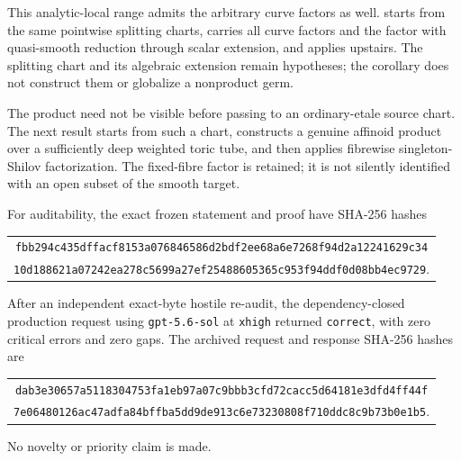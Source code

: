 This analytic-local range admits the arbitrary curve factors as well.
 starts from
the same pointwise splitting charts, carries all curve factors and the factor
with quasi-smooth reduction through scalar extension, and applies
 upstairs.  The
splitting chart and its algebraic extension remain hypotheses; the
corollary does not construct them or globalize a nonproduct germ.

The product need not be visible before passing to an ordinary-etale source
chart.  The next result starts from such a chart, constructs a genuine
affinoid product over a sufficiently deep weighted toric tube, and then
applies fibrewise singleton-Shilov factorization.  The fixed-fibre factor is
retained; it is not silently identified with an open subset of the smooth
target.

For auditability, the exact frozen statement and proof have SHA-256 hashes
\begin{center}
\small
\begin{tabular}{@{}c@{}}
\nolinkurl{fbb294c435dffacf8153a076846586d2bdf2ee68a6e7268f94d2a12241629c34}\\
\nolinkurl{10d188621a07242ea278c5699a27ef25488605365c953f94ddf0d08bb4ec9729}.
\end{tabular}
\end{center}
After an independent exact-byte hostile re-audit, the dependency-closed
production request using \texttt{gpt-5.6-sol} at \texttt{xhigh} returned
\texttt{correct}, with zero critical errors and zero gaps.  The archived
request and response SHA-256 hashes are
\begin{center}
\small
\begin{tabular}{@{}c@{}}
\nolinkurl{dab3e30657a5118304753fa1eb97a07c9bbb3cfd72cacc5d64181e3dfd4ff44f}\\
\nolinkurl{7e06480126ac47adfa84bffba5dd9de913c6e73230808f710ddc8c9b73b0e1b5}.
\end{tabular}
\end{center}
No novelty or priority claim is made.







